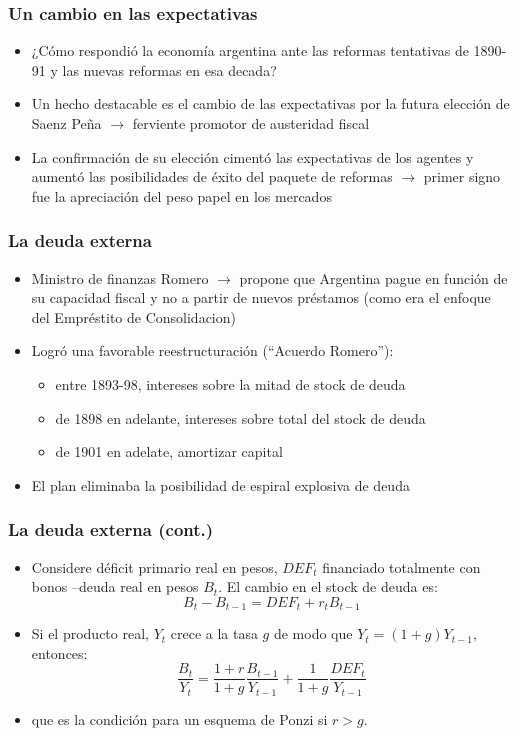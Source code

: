 \documentclass[14pt,aspectratio=169]{beamer}
\begin{document}
      
\begin{frame}\frametitle{Un cambio en las expectativas}
   \begin{itemize}
\item ¿Cómo respondió la economía argentina ante las reformas
  tentativas de 1890-91 y las nuevas reformas en esa decada?
  \item Un hecho destacable es el cambio de las expectativas por la
    futura elección de Saenz Peña $\longrightarrow$ ferviente promotor
    de austeridad fiscal
    \item La confirmación de su elección cimentó las expectativas de
      los agentes y aumentó las posibilidades de éxito del paquete de
      reformas $\longrightarrow$ primer signo fue la apreciación del
      peso papel en los mercados
    \end{itemize}
      \end{frame}

      
\begin{frame}\frametitle{La deuda externa}
   \begin{itemize}
\item Ministro de finanzas Romero  $\longrightarrow$ propone que
  Argentina pague en función de su capacidad fiscal y no a partir de
  nuevos préstamos (como era el enfoque del Empréstito de Consolidacion)
\item Logró una favorable reestructuración (``Acuerdo Romero''):
  \begin{itemize}\itemsep 10pt \medskip
    \item entre 1893-98, intereses
      sobre la mitad de stock de deuda 
      \item de 1898 en adelante, intereses sobre total del stock de
        deuda
      \item de 1901 en adelate, amortizar capital
      \end{itemize}
      \item El plan eliminaba la posibilidad de espiral explosiva de deuda
    \end{itemize}
      \end{frame}


\begin{frame}\frametitle{La deuda externa (cont.)}
   \begin{itemize}
\item Considere déficit primario real en pesos, $DEF_{t}$ financiado totalmente con
  bonos --deuda real en pesos $B_{t}$. El cambio en el stock de deuda es:
  \begin{equation*}
    B_{t}-B_{t-1}=DEF_{t}+r_{t}B_{t-1}
        \end{equation*}
\item Si el producto real, $Y_{t}$ crece a la tasa $g$ de modo que
  $Y_{t}=(1+g)Y_{t-1}$, entonces:
  \begin{equation*}
\frac{B_{t}}{Y_{t}}=\frac{1+r}{1+g}\frac{B_{t-1}}{Y_{t-1}}+\frac{1}{1+g}\frac{DEF_{t}}{Y_{t-1}}
\end{equation*}
\item que es la condición para un esquema de Ponzi si $r>g$. 
      \end{itemize}
      \end{frame}
\end{document}
